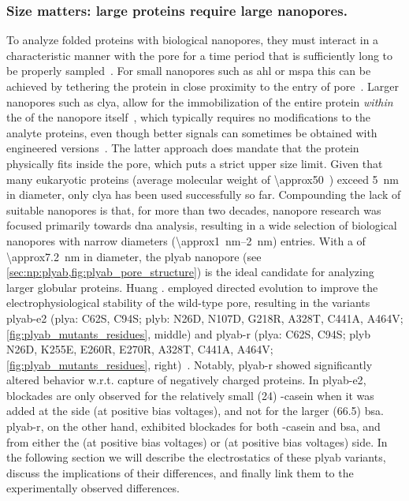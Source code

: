 \subsubsection{Size matters: large proteins require large nanopores.}
%
To analyze folded proteins with biological nanopores, they must interact in a characteristic manner with the
pore for a time period that is sufficiently long to be properly sampled~\cite{Willems-VanMeervelt-2017}. For
small nanopores such as \gls{ahl} or \gls{mspa} this can be achieved by tethering the protein in close
proximity to the entry of pore~\cite{Movileanu-2000,Fahie-2015,Ho-2015,Laszlo-2016,Thakur-2019}. Larger
nanopores such as \gls{clya}, allow for the immobilization of the entire protein \emph{within} the \lumen{} of
the nanopore
itself~\cite{Soskine-2012,Soskine-2013,Soskine-Biesemans-2015,Biesemans-2015,Wloka-2016,VanMeervelt-2017,Galenkamp-2018,Galenkamp-2020},
which typically requires no modifications to the analyte proteins, even though better signals can sometimes be
obtained with engineered versions~\cite{Soskine-Biesemans-2015,Galenkamp-2020}. The latter approach does
mandate that the protein physically fits inside the pore, which puts a strict upper size limit. Given that
many eukaryotic proteins (average molecular weight of \SI{\approx50}{\kDa}~\cite{Kozlowski-2016}) exceed
\SI{5}{\nm} in diameter, only \gls{clya} has been used successfully so far. Compounding the lack of suitable
nanopores is that, for more than two decades, nanopore research was focused primarily towards \gls{dna}
analysis, resulting in a wide selection of biological nanopores with narrow diameters
(\SIrange{\approx1}{2}{\nm}) entries. With a \lumen{} of \SI{\approx7.2}{\nm} in diameter, the \gls{plyab}
nanopore (see \cref{sec:np:plyab,fig:plyab_pore_structure}) is the ideal candidate for analyzing larger
globular proteins. Huang \etal. employed directed evolution to improve the electrophysiological stability of
the wild-type pore, resulting in the variants \gls{plyab-e2} (\gls{plya}: C62S, C94S; \gls{plyb}: N26D, N107D,
G218R, A328T, C441A, A464V; \cref{fig:plyab_mutants_residues}, middle) and \gls{plyab-r} (\gls{plya}: C62S,
C94S; \gls{plyb} N26D, K255E, E260R, E270R, A328T, C441A, A464V; \cref{fig:plyab_mutants_residues},
right)~\cite{Huang-2020}. Notably, \gls{plyab-r} showed significantly altered behavior w.r.t. capture of
negatively charged proteins. In \gls{plyab-e2}, blockades are only observed for the relatively small
(\SI{24}{\kDa}) \tb-casein when it was added at the \transi{} side (at positive bias voltages), and not for
the larger (\SI{66.5}{\kDa}) \gls{bsa}. \gls{plyab-r}, on the other hand, exhibited blockades for both
\tb-casein and \gls{bsa}, and from either the \cisi{} (at positive bias voltages) or \transi{} (at positive
bias voltages) side. In the following section we will describe the electrostatics of these \gls{plyab}
variants, discuss the implications of their differences, and finally link them to the experimentally observed
differences.

